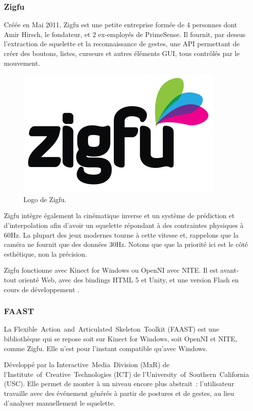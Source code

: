 \subsubsection{Zigfu}
Créée en Mai 2011, Zigfu est une petite entreprise formée de 4 personnes dont 
Amir Hirsch, le fondateur, et 2 ex-employés de PrimeSense. Il fournit, 
par dessus l'extraction de squelette et la reconnaissance
de gestes, une API permettant de créer des boutons, listes, curseurs et autres
éléments GUI, tous contrôlés par le mouvement.
\begin{figure}[h!]
\centering
\includegraphics[width=0.3\linewidth]{../images/zigfu_logo}
\caption{Logo de Zigfu.}
\end{figure}
Zigfu intègre également la cinématique inverse et un système de 
prédiction et
d'interpolation afin d'avoir un squelette répondant à des contraintes 
physiques à 60Hz\cite{zigfu_video}. La plupart des jeux modernes tourne à cette 
vitesse et, 
rappelons que la caméra ne fournit que des données 30Hz. Notons que
que la priorité ici est le côté esthétique,
non la précision.

Zigfu fonctionne avec Kinect for Windows ou OpenNI avec NITE. Il est 
avant-tout orienté Web, avec des
bindings HTML 5 et Unity, et une version Flash en cours de développement
\cite{zigfu_review}.

\subsubsection{FAAST}
La Flexible~Action~and~Articulated~Skeleton~Toolkit (FAAST) est une 
bibliothèque qui se repose soit sur Kinect for Windows, soit OpenNI et NITE, 
comme Zigfu. Elle n'est pour l'instant compatible qu'avec Windows.

Développé par la Interactive~Media~Division (MxR) de 
l'Institute~of~Creative~Technologies (ICT) de 
l'University~of~Southern~California (USC). Elle permet de monter à un niveau 
encore plus abstrait~: l'utilisateur travaille avec des événement générés à
partir de postures et de gestes, au lieu d'analyser manuellement le 
squelette.


